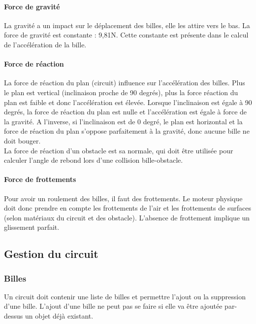\documentclass{report}
\begin{document}
\paragraph{Force de gravité}

La gravité a un impact sur le déplacement des billes, elle les attire vers le bas. La force de gravité est constante : 9,81N. Cette constante est présente dans le calcul de l’accélération de la bille.

\paragraph{Force de réaction}

La force de réaction du plan (circuit) influence sur l’accélération des billes. Plus le plan est vertical (inclinaison proche de 90 degrés), plus la force réaction du plan est faible et donc l’accélération est élevée. Lorsque l’inclinaison est égale à 90 degrés, la force de réaction du plan est nulle et l’accélération est égale à force de la gravité. A l’inverse, si l’inclinaison est de 0 degré, le plan est horizontal et la force de réaction du plan s’oppose parfaitement à la gravité, donc aucune bille ne doit bouger. \\

La force de réaction d’un obstacle est sa normale, qui doit être utilisée pour calculer l’angle de rebond lors d’une collision bille-obstacle. 


\paragraph{Force de frottements}

Pour avoir un roulement des billes, il faut des frottements.  Le moteur physique doit donc prendre en compte les frottements de l’air et les frottements de surfaces (selon matériaux du circuit et des obstacle). L’absence de frottement implique un glissement parfait.

\subsection{Gestion du circuit}

\subsubsection{Billes}

Un circuit doit contenir une liste de billes et permettre l’ajout ou la suppression d’une bille. L’ajout d’une bille ne peut pas se faire si elle va être ajoutée par-dessus un objet déjà existant.
\end{document}
